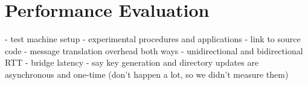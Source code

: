 \section{Performance Evaluation}
- test machine setup
- experimental procedures and applications
- link to source code
- message translation overhead both ways
- unidirectional and bidirectional RTT
- bridge latency
- say key generation and directory updates are asynchronous and one-time (don't happen a lot, so we didn't measure them)
